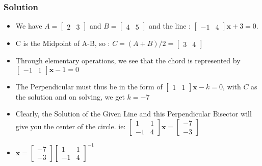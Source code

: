 \documentclass{beamer}
\begin{document}
\begin{frame}
\frametitle{Solution}
\begin{itemize}
 \item<1-> We have $A = \begin{bmatrix} 2 & 3
 \end{bmatrix}$ and $B = \begin{bmatrix} 4 & 5
 \end{bmatrix}$ and the line : $ \begin{bmatrix}
 -1 & 4
 \end{bmatrix}\mathbf{x} + 3 = 0$. 
 \item<2-> C is the Midpoint of A-B, so : $C = (A+B)/2 = \begin{bmatrix} 3 & 4
 \end{bmatrix}$
 \item<3-> Through elementary operations, we see that the chord is represented by $\begin{bmatrix}
 -1 & 1 
 \end{bmatrix} \mathbf{x} - 1 = 0$
 \item<4-> The Perpendicular must thus be in the form of $\begin{bmatrix}
 1 & 1 
 \end{bmatrix} \mathbf{x} - k = 0$, with $C$ as the solution and on solving, we get $k = -7$
 \item<5-> Clearly, the Solution of the Given Line and this Perpendicular Bisector will give you the center of the circle. ie: \newline
 $\begin{bmatrix}
 1 & 1 \\
 -1 & 4 
 \end{bmatrix} \mathbf{x} = \begin{bmatrix}
 	-7 \\
 	 -3 
 \end{bmatrix}$
 \item<6-> $\mathbf{x} = \begin{bmatrix}
 	-7 \\
 	-3 
 \end{bmatrix}$$\begin{bmatrix}
1 & 1 \\
-1 & 4 
\end{bmatrix}^{-1}$

  
 
 
\end{itemize}

\end{frame}
\end{document}
